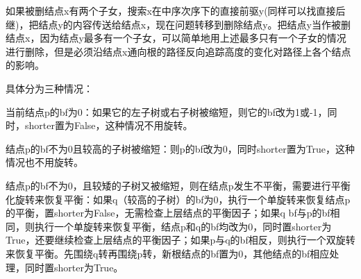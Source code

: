 如果被删结点x有两个子女，搜索x在中序次序下的直接前驱y(同样可以找直接后继)，把结点y的内容传送给结点x，现在问题转移到删除结点y。把结点y当作被删结点x，因为结点y最多有一个子女，可以简单地用上述最多只有一个子女的情况进行删除，但是必须沿结点x通向根的路径反向追踪高度的变化对路径上各个结点的影响。

具体分为三种情况：

当前结点p的bf为0：如果它的左子树或右子树被缩短，则它的bf改为1或-1，同时，shorter置为False，这种情况不用旋转。

结点p的bf不为0且较高的子树被缩短：则p的bf改为0，同时shorter置为True，这种情况也不用旋转。

结点p的bf不为0，且较矮的子树又被缩短，则在结点p发生不平衡，需要进行平衡化旋转来恢复平衡：如果q（较高的子树）的bf为0，执行一个单旋转来恢复结点p的平衡，置shorter为False，无需检查上层结点的平衡因子；如果q bf与p的bf相同，则执行一个单旋转来恢复平衡，结点p和q的bf均改为0，同时置shorter为True，还要继续检查上层结点的平衡因子；如果p与q的bf相反，则执行一个双旋转来恢复平衡。先围绕q转再围绕p转，新根结点的bf置为0，其他结点的bf相应处理，同时置shorter为True。


